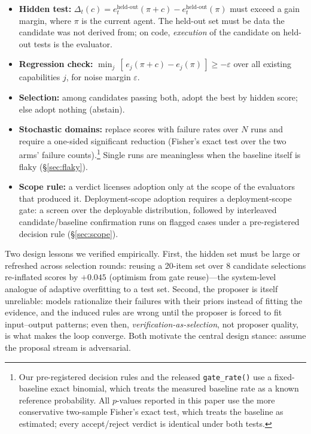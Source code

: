 \documentclass{article}
\begin{document}
\begin{itemize}
\item \textbf{Hidden test:} $\Delta_t(c) = e_t^{\text{held-out}}(\pi + c) - e_t^{\text{held-out}}(\pi)$
must exceed a gain margin, where $\pi$ is the current agent. The held-out set must be data the candidate
was not derived from; on code, \emph{execution} of the candidate on held-out tests is the evaluator.
\item \textbf{Regression check:} $\min_j\, [\,e_j(\pi + c) - e_j(\pi)\,] \ge -\varepsilon$ over all
existing capabilities $j$, for noise margin $\varepsilon$.
\item \textbf{Selection:} among candidates passing both, adopt the best by hidden score; else adopt
nothing (abstain).
\item \textbf{Stochastic domains:} replace scores with failure rates over $N$ runs and require a
one-sided significant reduction (Fisher's exact test over the two arms' failure
counts).\footnote{Our pre-registered decision rules and the released \texttt{gate\_rate()} use a
fixed-baseline exact binomial, which treats the measured baseline rate as a known reference
probability. All $p$-values reported in this paper use the more conservative two-sample Fisher's
exact test, which treats the baseline as estimated; every accept/reject verdict is identical under
both tests.} Single runs are meaningless when the baseline
itself is flaky (\S\ref{sec:flaky}).
\item \textbf{Scope rule:} a verdict licenses adoption only at the scope of the evaluators that produced
it. Deployment-scope adoption requires a deployment-scope gate: a screen over the deployable
distribution, followed by interleaved candidate/baseline confirmation runs on flagged cases under a
pre-registered decision rule (\S\ref{sec:scope}).
\end{itemize}

Two design lessons we verified empirically. First, the hidden set must be large or refreshed across
selection rounds: reusing a 20-item set over 8 candidate selections re-inflated scores by $+0.045$
(optimism from gate reuse)---the system-level analogue of adaptive overfitting to a test set. Second,
the proposer is itself unreliable: models rationalize their failures with their priors instead of
fitting the evidence, and the induced rules are wrong until the proposer is forced to fit
input--output patterns; even then, \emph{verification-as-selection}, not proposer quality, is what makes
the loop converge. Both motivate the central design stance: assume the proposal stream is adversarial.
\end{document}
